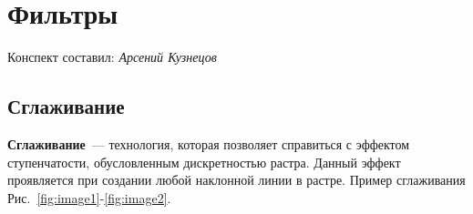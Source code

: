 \section{Фильтры}
\begin{center}
    Конспект составил: \textit{Арсений Кузнецов}
\end{center}

\subsection{Сглаживание}

\textbf{Сглаживание}~--- технология, которая позволяет справиться с эффектом ступенчатости, обусловленным дискретностью растра. Данный эффект проявляется при создании любой наклонной линии в растре. Пример сглаживания Рис.~\ref{fig:image1}-\ref{fig:image2}.

